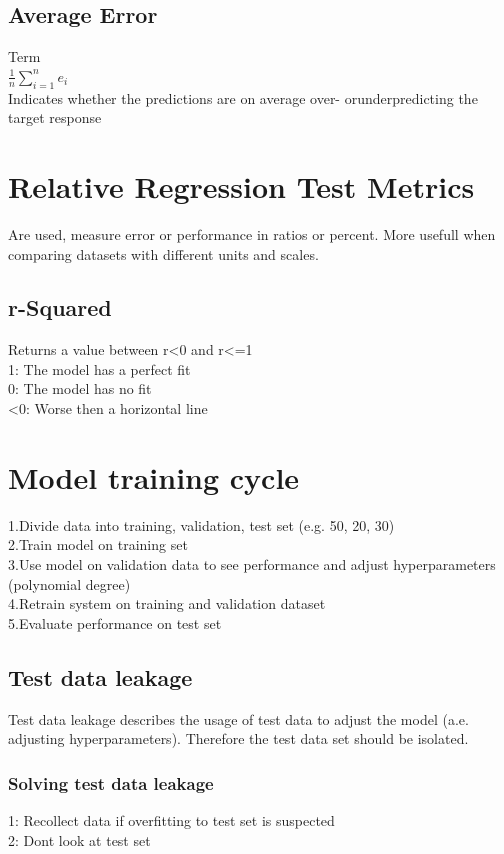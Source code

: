 \documentclass{article}
\begin{document}
\subsection{Average Error}
Term\\
$ \frac{1}{n} \sum_{i = 1}^{n} e_i$ \\
Indicates whether the predictions are on average over- orunderpredicting the target response
\section{Relative Regression Test Metrics}
Are used, measure error or performance in ratios or percent. More usefull when comparing datasets with different units and scales. \\ 

\subsection{r-Squared}
Returns a value between r<0 and r<=1\\
1: The model has a perfect fit \\
0: The model has no fit \\
<0: Worse then a horizontal line\\
\section{Model training cycle}
1.Divide data into training, validation, test set (e.g. 50, 20, 30)\\ 
2.Train model on training set\\
3.Use model on validation data to see performance and adjust hyperparameters (polynomial degree)\\
4.Retrain system on training and validation dataset \\ 
5.Evaluate performance on test set \\
\subsection{Test data leakage}
Test data leakage describes the usage of test data to adjust the model (a.e. adjusting hyperparameters). Therefore the test data set should be isolated.\\
\subsubsection{Solving test data leakage}
1: Recollect data if overfitting to test set is suspected\\
2: Dont look at test set 
\end{document}
